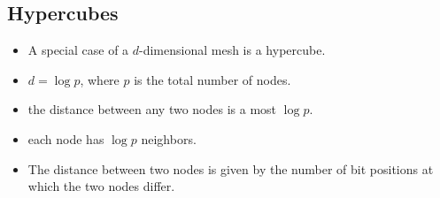 \documentclass[11pt,a4paper]{report}
\begin{document}

\subsection{Hypercubes} %
\label{sub:Hypercubes}

\begin{itemize}
    \item A special case of a $d$-dimensional mesh is a hypercube.
    \item $d=\log p$, where $p$ is the total number of nodes.
    \item the distance between any two nodes is a most $\log p$.
    \item each node has $\log p$ neighbors.
    \item The distance between two nodes is given by the number of bit positions at which the two nodes differ.
\end{itemize}
\end{document}
